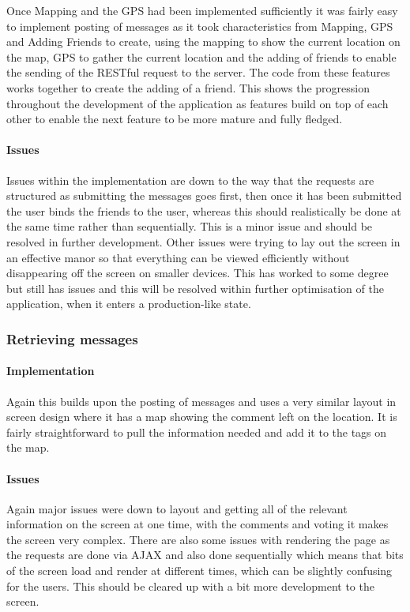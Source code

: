 Once Mapping and the GPS had been implemented sufficiently it was fairly easy to implement posting of messages as it took characteristics from Mapping, GPS and Adding Friends to create, using the mapping to show the current location on the map, GPS to gather the current location and the adding of friends to enable the sending of the RESTful request to the server. The code from these features works together to create the adding of a friend. This shows the progression throughout the development of the application as features build on top of each other to enable the next feature to be more mature and fully fledged.

\paragraph*{Issues}

Issues within the implementation are down to the way that the requests are structured as submitting the messages goes first, then once it has been submitted the user binds the friends to the user, whereas this should realistically be done at the same time rather than sequentially. This is a minor issue and should be resolved in further development. Other issues were trying to lay out the screen in an effective manor so that everything can be viewed efficiently without disappearing off the screen on smaller devices. This has worked to some degree but still has issues and this will be resolved within further optimisation of the application, when it enters a production-like state.

\subsubsection{Retrieving messages}

\paragraph*{Implementation}

Again this builds upon the posting of messages and uses a very similar layout in screen design where it has a map showing the comment left on the location. It is fairly straightforward to pull the information needed and add it to the tags on the map. 

\paragraph*{Issues}

Again major issues were down to layout and getting all of the relevant information on the screen at one time, with the comments and voting it makes the screen very complex. There are also some issues with rendering the page as the requests are done via AJAX and also done sequentially which means that bits of the screen load and render at different times, which can be slightly confusing for the users. This should be cleared up with a bit more development to the screen.

